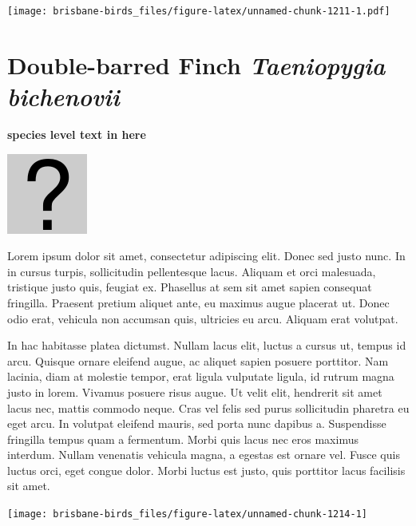 \documentclass[]{book}
\let\origfigure\figure
\let\endorigfigure\endfigure
\renewenvironment{figure}[1][2] {
  \expandafter\origfigure\expandafter[H]
} {
  \endorigfigure
}
\begin{document}
\begin{figure}
\centering
\texttt{[image: brisbane-birds\_files/figure-latex/unnamed-chunk-1211-1.pdf]}
\caption{\label{fig:unnamed-chunk-1211}insert figure caption}
\end{figure}

\section{\texorpdfstring{Double-barred Finch \emph{Taeniopygia
bichenovii}}{Double-barred Finch Taeniopygia bichenovii}}\label{double-barred-finch-taeniopygia-bichenovii}

\textbf{species level text in here}

\begin{figure}
\centering
\includegraphics{assets/missing.png}
\caption{No image for species}
\end{figure}

Lorem ipsum dolor sit amet, consectetur adipiscing elit. Donec sed justo
nunc. In in cursus turpis, sollicitudin pellentesque lacus. Aliquam et
orci malesuada, tristique justo quis, feugiat ex. Phasellus at sem sit
amet sapien consequat fringilla. Praesent pretium aliquet ante, eu
maximus augue placerat ut. Donec odio erat, vehicula non accumsan quis,
ultricies eu arcu. Aliquam erat volutpat.

In hac habitasse platea dictumst. Nullam lacus elit, luctus a cursus ut,
tempus id arcu. Quisque ornare eleifend augue, ac aliquet sapien posuere
porttitor. Nam lacinia, diam at molestie tempor, erat ligula vulputate
ligula, id rutrum magna justo in lorem. Vivamus posuere risus augue. Ut
velit elit, hendrerit sit amet lacus nec, mattis commodo neque. Cras vel
felis sed purus sollicitudin pharetra eu eget arcu. In volutpat eleifend
mauris, sed porta nunc dapibus a. Suspendisse fringilla tempus quam a
fermentum. Morbi quis lacus nec eros maximus interdum. Nullam venenatis
vehicula magna, a egestas est ornare vel. Fusce quis luctus orci, eget
congue dolor. Morbi luctus est justo, quis porttitor lacus facilisis sit
amet.

\begin{figure}
\texttt{[image: brisbane-birds\_files/figure-latex/unnamed-chunk-1214-1]} \caption{insert figure caption}\label{fig:unnamed-chunk-1214}
\end{figure}
\end{document}
